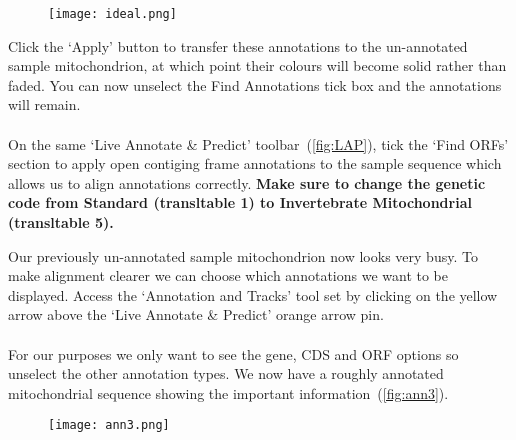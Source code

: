 \documentclass[11pt]{article}
\begin{document}
\begin{figure}[H]
  \centering
    \texttt{[image: ideal.png]}
  \label{fig:ideal}
\end{figure}

Click the `Apply' button to transfer these annotations to the un-annotated sample mitochondrion, at which point their colours will become solid rather than faded. You can now unselect the Find Annotations tick box and the annotations will remain. 
\\
\\
On the same `Live Annotate \& Predict' toolbar~(\autoref{fig:LAP}), tick the `Find ORFs' section to apply open contiging frame annotations to the sample sequence which allows us to align annotations correctly. \textbf{Make sure to change the genetic code from Standard (transl\textunderscore table 1) to Invertebrate Mitochondrial (transl\textunderscore table 5).}

\begin{figure}[H]
  \label{fig:blast5}\label{fig:LAP}
\end{figure}

Our previously un-annotated sample mitochondrion now looks very busy. To make alignment clearer we can choose which annotations we want to be displayed. Access the `Annotation and Tracks' tool set by clicking on the yellow arrow above the `Live Annotate \& Predict' orange arrow pin. 
\\
\\
For our purposes we only want to see the gene, CDS and ORF options so unselect the other annotation types. We now have a roughly annotated mitochondrial sequence showing the important information~(\autoref{fig:ann3}). 


\begin{figure}[H]
  \centering
    \texttt{[image: ann3.png]}
  \label{fig:ann3}
\end{figure}
\end{document}
